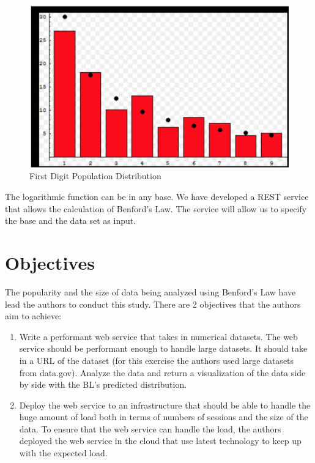 \begin{figure}[!ht]
\centering\includegraphics[width=\columnwidth]{images/benford_country.JPG}
  \caption{First Digit Population Distribution}\label{f:pop-dist-countries}
\end{figure}

The logarithmic function can be in any base. 
We have developed a REST service that allows
the calculation of Benford's Law. 
The service will allow us to specify 
the base and the data set as input. 

\section{Objectives}
The popularity and the size of data being 
analyzed using Benford’s Law have lead the authors 
to conduct this study. 
There are 2 objectives that the authors aim to achieve:

\begin{enumerate}
\item
Write a performant web service that takes in numerical datasets. 
The web service should be performant enough to handle large datasets. 
It should take in a URL of the dataset (for this exercise the authors used
large datasets from data.gov). Analyze the data and return a visualization 
of the data side by side with the BL’s predicted distribution.
\item
Deploy the web service to an infrastructure that should be able to handle 
the huge amount of load both in terms of numbers of sessions and the size 
of the data. To ensure that the web service can handle the load, 
the authors deployed the web service in the cloud that use latest 
technology to keep up with the expected load.
\end{enumerate}

